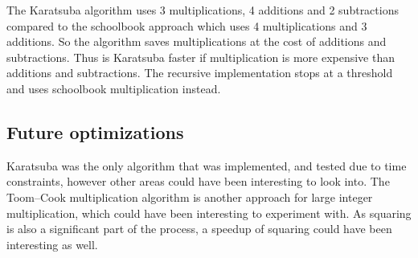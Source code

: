 The Karatsuba algorithm uses 3 multiplications, 4 additions and 2 subtractions compared to the schoolbook approach which uses 4 multiplications and 3 additions. So the algorithm saves multiplications at the cost of additions and subtractions. Thus is Karatsuba faster if multiplication is more expensive than additions and subtractions. The recursive implementation stops at a threshold and uses schoolbook multiplication instead.

\subsection{Future optimizations}
Karatsuba was the only algorithm that was implemented, and tested due to time constraints, however other areas could have been interesting to look into. The Toom–Cook multiplication algorithm is another approach for large integer multiplication, which could have been interesting to experiment with. As squaring is also a significant part of the process, a speedup of squaring could have been interesting as well. \\
\medskip
